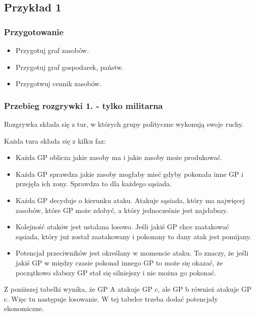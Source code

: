 \subsection{Przykład 1 }

\subsubsection{Przygotowanie}

\begin{itemize}
    \item Przygotuj graf zasobów.
    \item Przygotuj graf gospodarek, państw.
    \item Przygotwuj cennik zasobów.
\end{itemize}

\subsubsection{Przebieg rozgrywki 1. - tylko militarna}




Rozgrywka składa się z tur, w których grupy polityczne wykonują swoje ruchy. 

Każda tura składa się z kilku faz:
\begin{itemize}
    \item Każda GP oblicza jakie zasoby ma i jakie zasoby może produkować.
    \item Każda GP sprawdza jakie zasoby mogłaby mieć gdyby pokonała inne GP i przejęła ich zony. Sprawdza to dla każdego sąsiada.
    \item Każda GP decyduje o kierunku ataku. Atakuje sąsiada, który ma najwięcej zasobów, które GP może zdobyć, a który jednocześnie jest najsłabszy. 
    \item  Kolejność ataków jest ustalana losowo. Jeśli jakiś GP chce zaatakować sąsiada, który już został zaatakowany i pokonany to dany atak jest pomijany.
    \item Potencjał przeciwników jest określany w momencie ataku. To znaczy, że jeśli jakiś GP w między czasie pokonał innego GP to może się okazać, że początkowo słabszy GP stał się silniejszy i nie można go pokonać.
\end{itemize}
Z poniższej tabelki wynika, że GP A atakuje GP c, ale GP b również atakuje GP c. Więc tu następuje losowanie.
W tej tabelce trzeba dodać potencjały ekonomiczne.

